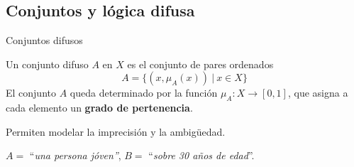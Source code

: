 \documentclass[10pt, spanish]{beamer}
\begin{document}
\subsection{Conjuntos y lógica difusa}


\begin{frame}{Conjuntos difusos}
\begin{definition}
	Un conjunto difuso $A$ en $X$ es el conjunto de pares ordenados
\[
A = \{ (x, \mu_A(x)) \ | \ x \in X \}
\]
El conjunto $A$ queda determinado por la función $\mu_A: X \longrightarrow [0,1]$, que asigna a cada elemento un \textbf{grado de pertenencia}.
\end{definition}

\vspace{1em}
Permiten modelar la imprecisión y la ambigüedad.
\begin{example}
	$A =$ ``\textit{una persona jóven''}, $B=$ ``\textit{sobre 30 años de edad}''.
\end{example}
\end{frame}
\end{document}
